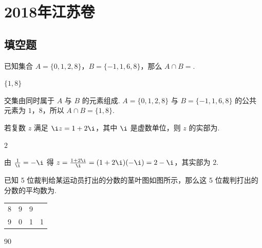 

\chapter{2018年江苏卷}

\section{填空题}

\begin{problem}
已知集合 \(A=\{0,1,2,8\}\)，\(B=\{-1,1,6,8\}\)，那么 \(A\cap B=\)\fillinblank{}.
\end{problem}

\begin{answer}
\(\{1,8\}\)
\end{answer}

\begin{solution}
交集由同时属于 \(A\) 与 \(B\) 的元素组成. \(A=\{0,1,2,8\}\) 与 \(B=\{-1,1,6,8\}\) 的公共元素为 \(1\)，\(8\)，所以 \(A\cap B=\{1,8\}\).
\end{solution}

\begin{problem}
若复数 \(z\) 满足 \(\i z=1+2\i\)，其中 \(\i\) 是虚数单位，则 \(z\) 的实部为\fillinblank{}.
\end{problem}

\begin{answer}
\(2\)
\end{answer}

\begin{solution}
由 \(\frac{1}{\i}=-\i\) 得 \(z=\frac{1+2\i}{\i}=(1+2\i)(-\i)=2-\i\)，其实部为 \(2\).
\end{solution}

\begin{problem}
已知 5 位裁判给某运动员打出的分数的茎叶图如图所示，那么这 5 位裁判打出的分数的平均数为\fillinblank{}.

\begin{center}
\begin{tabular}{r|lll}
8 & 9 & 9 & \\
9 & 0 & 1 & 1
\end{tabular}
\end{center}
\end{problem}

\begin{answer}
\(90\)
\end{answer}


